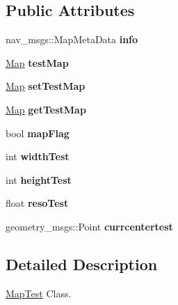 \subsection*{Public Attributes}
\begin{DoxyCompactItemize}
\item 
nav\+\_\+msgs\+::\+Map\+Meta\+Data {\bfseries info}\hypertarget{classMapTest_a333b326a68d2b79700fcddb47b7f57e6}{}\label{classMapTest_a333b326a68d2b79700fcddb47b7f57e6}

\item 
\hyperlink{classMap}{Map} {\bfseries test\+Map}\hypertarget{classMapTest_aff93358464beda2ebc07e8a8ba4eea08}{}\label{classMapTest_aff93358464beda2ebc07e8a8ba4eea08}

\item 
\hyperlink{classMap}{Map} {\bfseries set\+Test\+Map}\hypertarget{classMapTest_a36961e285b2985e36e1e7a461c8d4ec1}{}\label{classMapTest_a36961e285b2985e36e1e7a461c8d4ec1}

\item 
\hyperlink{classMap}{Map} {\bfseries get\+Test\+Map}\hypertarget{classMapTest_a5d4095ff258b0e05bf5ac635f9876dbb}{}\label{classMapTest_a5d4095ff258b0e05bf5ac635f9876dbb}

\item 
bool {\bfseries map\+Flag}\hypertarget{classMapTest_a496078ef68b6350c22d01e8feef78ddf}{}\label{classMapTest_a496078ef68b6350c22d01e8feef78ddf}

\item 
int {\bfseries width\+Test}\hypertarget{classMapTest_aea4202c465fdd1e3e43973254d0ced2b}{}\label{classMapTest_aea4202c465fdd1e3e43973254d0ced2b}

\item 
int {\bfseries height\+Test}\hypertarget{classMapTest_a8f2c13fd53b8f7bf8d37ac6e20e2bcb6}{}\label{classMapTest_a8f2c13fd53b8f7bf8d37ac6e20e2bcb6}

\item 
float {\bfseries reso\+Test}\hypertarget{classMapTest_a84ae73719f2d147a7251d6d643962b97}{}\label{classMapTest_a84ae73719f2d147a7251d6d643962b97}

\item 
geometry\+\_\+msgs\+::\+Point {\bfseries currcentertest}\hypertarget{classMapTest_a8fd0be31559213669a0664bdfd73bc85}{}\label{classMapTest_a8fd0be31559213669a0664bdfd73bc85}

\end{DoxyCompactItemize}


\subsection{Detailed Description}
\hyperlink{classMapTest}{Map\+Test} Class. 

